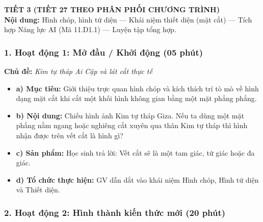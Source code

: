 \documentclass[12pt, a4paper]{article}
\begin{document}
\newpage

{\large \textbf{TIẾT 3 (TIẾT 27 THEO PHÂN PHỐI CHƯƠNG TRÌNH)}}\\[0.3em]
\textbf{Nội dung:} Hình chóp, hình tứ diện --- Khái niệm thiết diện (mặt cắt) --- Tích hợp Năng lực AI (Mã 11.D1.1) --- Luyện tập tổng hợp.

\subsubsection*{1. Hoạt động 1: Mở đầu / Khởi động (05 phút)}
\textbf{Chủ đề:} \textit{Kim tự tháp Ai Cập và lát cắt thực tế}
\begin{itemize}
    \item \textbf{a) Mục tiêu:} Giới thiệu trực quan hình chóp và kích thích trí tò mò về hình dạng mặt cắt khi cắt một khối hình không gian bằng một mặt phẳng phẳng.
    \item \textbf{b) Nội dung:} Chiếu hình ảnh Kim tự tháp Giza. Nếu ta dùng một mặt phẳng nằm ngang hoặc nghiêng cắt xuyên qua thân Kim tự tháp thì hình nhận được trên vết cắt là hình gì?
    \item \textbf{c) Sản phẩm:} Học sinh trả lời: Vết cắt sẽ là một tam giác, tứ giác hoặc đa giác.
    \item \textbf{d) Tổ chức thực hiện:} GV dẫn dắt vào khái niệm Hình chóp, Hình tứ diện và Thiết diện.
\end{itemize}

\subsubsection*{2. Hoạt động 2: Hình thành kiến thức mới (20 phút)}
\end{document}
